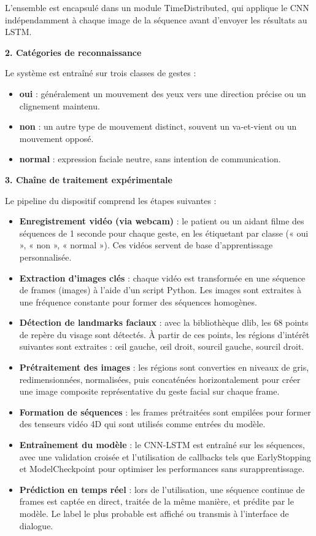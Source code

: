 \documentclass[
]{article}
\begin{document}
L'ensemble est encapsulé dans un module TimeDistributed, qui applique le CNN indépendamment à chaque image de la séquence avant d'envoyer les résultats au LSTM.

\textbf{2. Catégories de reconnaissance}

Le système est entraîné sur trois classes de gestes :

\begin{itemize}
\item
  \textbf{oui} : généralement un mouvement des yeux vers une direction précise ou un clignement maintenu.
\item
  \textbf{non} : un autre type de mouvement distinct, souvent un va-et-vient ou un mouvement opposé.
\item
  \textbf{normal} : expression faciale neutre, sans intention de communication.
\end{itemize}

\textbf{3. Chaîne de traitement expérimentale}

Le pipeline du dispositif comprend les étapes suivantes :

\begin{itemize}
\item
  \textbf{Enregistrement vidéo (via webcam)} : le patient ou un aidant filme des séquences de 1 seconde pour chaque geste, en les étiquetant par classe (« oui », « non », « normal »). Ces vidéos servent de base d'apprentissage personnalisée.
\item
  \textbf{Extraction d'images clés} : chaque vidéo est transformée en une séquence de frames (images) à l'aide d'un script Python. Les images sont extraites à une fréquence constante pour former des séquences homogènes.
\item
  \textbf{Détection de landmarks faciaux} : avec la bibliothèque dlib, les 68 points de repère du visage sont détectés. À partir de ces points, les régions d'intérêt suivantes sont extraites : œil gauche, œil droit, sourcil gauche, sourcil droit.
\item
  \textbf{Prétraitement des images} : les régions sont converties en niveaux de gris, redimensionnées, normalisées, puis concaténées horizontalement pour créer une image composite représentative du geste facial sur chaque frame.
\item
  \textbf{Formation de séquences} : les frames prétraitées sont empilées pour former des tenseurs vidéo 4D qui sont utilisés comme entrées du modèle.
\item
  \textbf{Entraînement du modèle} : le CNN-LSTM est entraîné sur les séquences, avec une validation croisée et l'utilisation de callbacks tels que EarlyStopping et ModelCheckpoint pour optimiser les performances sans surapprentissage.
\item
  \textbf{Prédiction en temps réel} : lors de l'utilisation, une séquence continue de frames est captée en direct, traitée de la même manière, et prédite par le modèle. Le label le plus probable est affiché ou transmis à l'interface de dialogue.
\end{itemize}
\end{document}
